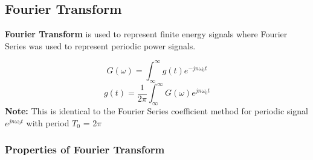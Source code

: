 \documentclass[11pt]{article}
\begin{document}
\subsection{Fourier Transform}

\textbf{Fourier Transform} is used to represent finite energy signals where Fourier Series was used to represent periodic power signals.

$$G(\omega) = \int_\infty^\infty g(t)e^{-jn\omega_0t}$$
$$g(t) = \frac{1}{2\pi}\int_\infty^\infty G(\omega)e^{jn\omega_0t}$$ 
\hfill \break
\textbf{Note:} This is identical to the Fourier Series coefficient method for periodic signal $e^{jn\omega_0t}$ with period $T_0$ = 2$\pi$ 

\subsubsection{Properties of Fourier Transform}
\end{document}
